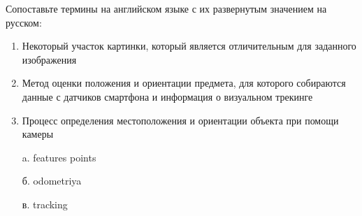 
Сопоставьте термины на английском языке с их развернутым значением на русском:

\begin{enumerate}
    \item Некоторый участок картинки, который является отличительным для заданного изображения
    \item Метод оценки положения и ориентации предмета, для которого собираются данные с датчиков смартфона и информация о визуальном трекинге
    \item Процесс определения местоположения и ориентации объекта при помощи камеры
\end{enumerate}

\begin{enumerate}
    \item[a.] features points
    \item[б.] odometriya
    \item[в.] tracking
\end{enumerate}

